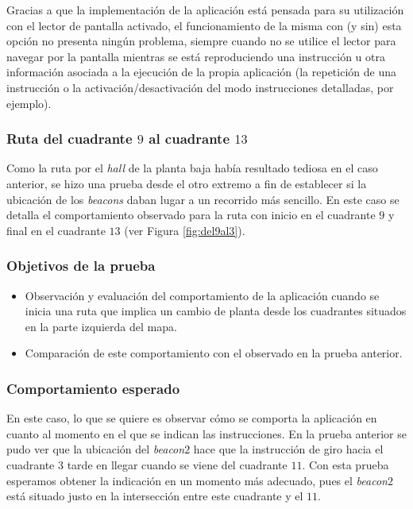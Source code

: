 Gracias a que la implementación de la aplicación está pensada para su utilización con el lector de pantalla activado, el funcionamiento de la misma con (y sin) esta opción no presenta ningún problema, siempre cuando no se utilice el lector para navegar por la pantalla mientras se está reproduciendo una instrucción u otra información asociada a la ejecución de la propia aplicación (la repetición de una instrucción o la activación/desactivación del modo instrucciones detalladas, por ejemplo).


\subsubsection{Ruta del cuadrante $9$ al cuadrante $13$}
\label{subsub:9al13}

Como la ruta por el \textit{hall} de la planta baja había resultado tediosa en el caso anterior, se hizo una prueba desde el otro extremo a fin de establecer si la ubicación de los \textit{beacons} daban lugar a un recorrido más sencillo. En este caso se detalla el comportamiento observado para la ruta con inicio en el cuadrante $9$ y final en el cuadrante $13$ (ver Figura \ref{fig:del9al3}).

\subsubsection*{Objetivos de la prueba}

\begin{itemize}
	\item Observación y evaluación del comportamiento de la aplicación cuando se inicia una ruta que implica un cambio de planta desde los cuadrantes situados en la parte izquierda del mapa.
	\item Comparación de este comportamiento con el observado en la prueba anterior.
\end{itemize}


\subsubsection*{Comportamiento esperado}

En este caso, lo que se quiere es observar cómo se comporta la aplicación en cuanto al momento en el que se indican las instrucciones. En la prueba anterior se pudo ver que la ubicación del \textit{beacon$2$} hace que la instrucción de giro hacia el cuadrante $3$ tarde en llegar cuando se viene del cuadrante $11$. Con esta prueba esperamos obtener la indicación en un momento más adecuado, pues el \textit{beacon$2$} está situado justo en la intersección entre este cuadrante y el $11$.

